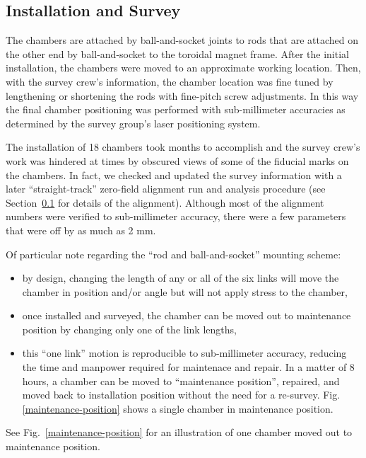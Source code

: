 \subsection{Installation and Survey}

The chambers are attached by ball-and-socket joints to rods that are attached
on the other end by ball-and-socket to the toroidal magnet frame.
After the initial installation, the chambers were moved to an approximate
working location.  Then, with the survey crew's information, the chamber location
was fine tuned by lengthening or shortening the rods with fine-pitch screw adjustments.
In this way the final chamber positioning was performed with sub-millimeter accuracies as
determined by the survey group's laser positioning system.

The installation of 18 chambers took months to accomplish and the survey crew's work
was hindered at times by obscured views of some of the fiducial marks on the 
chambers.  In fact, we checked and updated the survey information with a later 
``straight-track'' zero-field alignment run and analysis procedure (see Section~\ref{} for
details of the alignment).
Although most of the alignment numbers were verified to sub-millimeter accuracy, there
were a few parameters that were off by as much as 2 mm.

Of particular note regarding the ``rod and ball-and-socket'' mounting scheme:
\begin{itemize}
\item by design, changing the length of any or all of the six links will
move the chamber in position and/or angle but will not apply stress to the
chamber,
\item once installed and surveyed, the chamber can be moved out to maintenance
position by changing only one of the link lengths,
\item this ``one link'' motion is reproducible to sub-millimeter accuracy, reducing the time
and manpower required for maintenace and repair.  In a matter of 8 hours, a chamber 
can be moved to ``maintenance position'', repaired, and moved back to installation
position without the need for a re-survey.  Fig.\ref{maintenance-position} shows a single
chamber in maintenance position.
\end{itemize}
See Fig.~\ref{maintenance-position} for an illustration of one chamber moved out to
maintenance position.

